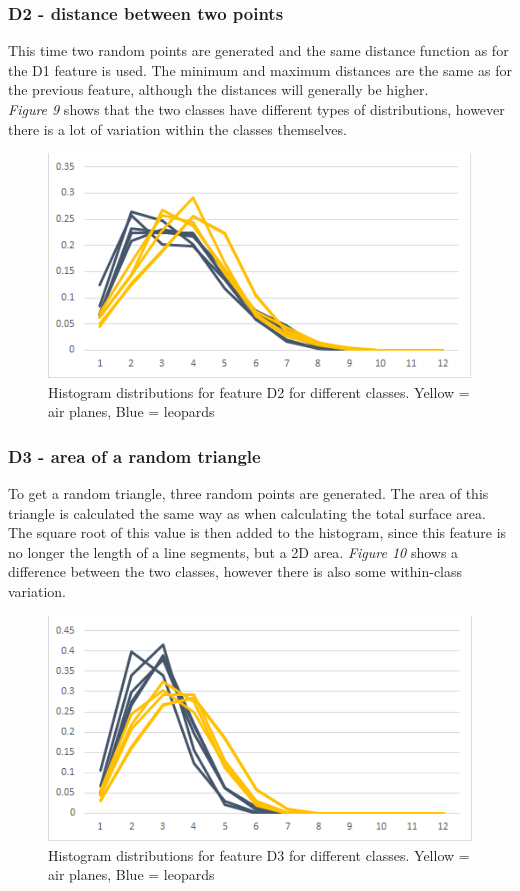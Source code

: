 \documentclass{bigdata}
\begin{document}
\subsubsection{D2 - distance between two points}
This time two random points are generated and the same distance function as for the D1 feature is used. The minimum and maximum distances are the same as for the previous feature, although the distances will generally be higher. \\
\textit{Figure 9} shows that the two classes have different types of distributions, however there is a lot of variation within the classes themselves.
\begin{figure}[h!]
\begin{center}
    \includegraphics[width=0.7\linewidth]{Pictures/Part3/D2.png}
    \caption{Histogram distributions for feature D2 for different classes. Yellow = air planes, Blue = leopards}
  \label{fig:eccentricity}
\end{center}
\end{figure}

\subsubsection{D3 - area of a random triangle}
To get a random triangle, three random points are generated. The area of this triangle is calculated the same way as when calculating the total surface area. The square root of this value is then added to the histogram, since this feature is no longer the length of a line segments, but a 2D area.
\textit{Figure 10} shows a difference between the two classes, however there is also some within-class variation. 

\begin{figure}[h!]	
\begin{center}
    \includegraphics[width=0.7\linewidth]{Pictures/Part3/D3.png}
    \caption{Histogram distributions for feature D3 for different classes. Yellow = air planes, Blue = leopards}
  \label{fig:eccentricity}
\end{center}
\end{figure}
\newpage
\end{document}
